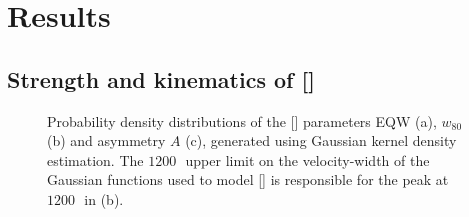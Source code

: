 \section{Results}

\subsection{Strength and kinematics of []}
\label{sec:ch4-basicresults}

\begin{figure}
    \captionsetup[subfigure]{labelformat=empty}
    \centering
    \subfloat[\label{fig:parameter_hists_a}]{}
    \subfloat[\label{fig:parameter_hists_b}]{}
    \subfloat[\label{fig:parameter_hists_c}]{}
    \caption[{Probability density distributions of the [] parameters EQW, $w_{80}$ and asymmetry $A$.}]{Probability density distributions of the [] parameters EQW (a), $w_{80}$ (b) and asymmetry $A$ (c), generated using Gaussian kernel density estimation. The $1200$\,\kms\, upper limit on the velocity-width of the Gaussian functions used to model [] is responsible for the peak at $1200$\,\kms\, in (b).}     
    \label{fig:parameter_hists}
\end{figure}

